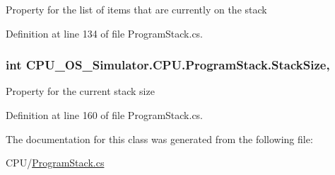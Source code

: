 Property for the list of items that are currently on the stack 



Definition at line 134 of file Program\+Stack.\+cs.

\hypertarget{class_c_p_u___o_s___simulator_1_1_c_p_u_1_1_program_stack_ac9cedcbfdf26ffa757042280f21da367}{}
\subsubsection[{Stack\+Size}]{\setlength{\rightskip}{0pt plus 5cm}int C\+P\+U\+\_\+\+O\+S\+\_\+\+Simulator.\+C\+P\+U.\+Program\+Stack.\+Stack\+Size\hspace{0.3cm}{\ttfamily [get]}, {\ttfamily [set]}}\label{class_c_p_u___o_s___simulator_1_1_c_p_u_1_1_program_stack_ac9cedcbfdf26ffa757042280f21da367}


Property for the current stack size 



Definition at line 160 of file Program\+Stack.\+cs.



The documentation for this class was generated from the following file\+:\begin{DoxyCompactItemize}
\item 
C\+P\+U/\hyperlink{_program_stack_8cs}{Program\+Stack.\+cs}\end{DoxyCompactItemize}
